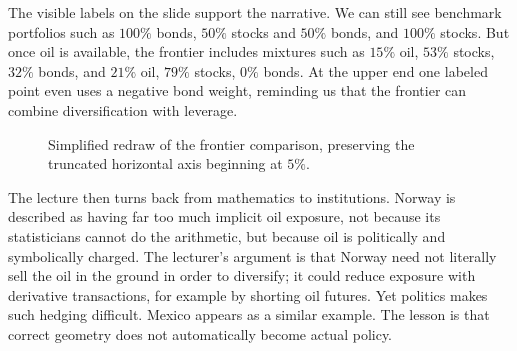 The visible labels on the slide support the narrative. We can still see benchmark portfolios such as \(100\%\) bonds, \(50\%\) stocks and \(50\%\) bonds, and \(100\%\) stocks. But once oil is available, the frontier includes mixtures such as \(15\%\) oil, \(53\%\) stocks, \(32\%\) bonds, and \(21\%\) oil, \(79\%\) stocks, \(0\%\) bonds. At the upper end one labeled point even uses a negative bond weight, reminding us that the frontier can combine diversification with leverage.

\begin{figure}[h]
\centering
{}
\caption{Simplified redraw of the frontier comparison, preserving the truncated horizontal axis beginning at \(5\%\).}
\end{figure}

The lecture then turns back from mathematics to institutions. Norway is described as having far too much implicit oil exposure, not because its statisticians cannot do the arithmetic, but because oil is politically and symbolically charged. The lecturer's argument is that Norway need not literally sell the oil in the ground in order to diversify; it could reduce exposure with derivative transactions, for example by shorting oil futures. Yet politics makes such hedging difficult. Mexico appears as a similar example. The lesson is that correct geometry does not automatically become actual policy.

